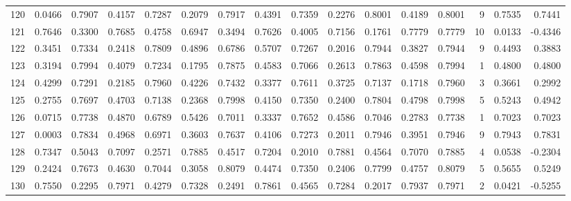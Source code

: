 \begin{tabular}{lrrrrrrrrrrrrrrr}
120 &      0.0466 &  0.7907 &  0.4157 &  0.7287 &  0.2079 &  0.7917 &  0.4391 &  0.7359 &  0.2276 &  0.8001 &   0.4189 &     0.8001 &      9 &                    0.7535 &                     0.7441 \\
121 &      0.7646 &  0.3300 &  0.7685 &  0.4758 &  0.6947 &  0.3494 &  0.7626 &  0.4005 &  0.7156 &  0.1761 &   0.7779 &     0.7779 &     10 &                    0.0133 &                    -0.4346 \\
122 &      0.3451 &  0.7334 &  0.2418 &  0.7809 &  0.4896 &  0.6786 &  0.5707 &  0.7267 &  0.2016 &  0.7944 &   0.3827 &     0.7944 &      9 &                    0.4493 &                     0.3883 \\
123 &      0.3194 &  0.7994 &  0.4079 &  0.7234 &  0.1795 &  0.7875 &  0.4583 &  0.7066 &  0.2613 &  0.7863 &   0.4598 &     0.7994 &      1 &                    0.4800 &                     0.4800 \\
124 &      0.4299 &  0.7291 &  0.2185 &  0.7960 &  0.4226 &  0.7432 &  0.3377 &  0.7611 &  0.3725 &  0.7137 &   0.1718 &     0.7960 &      3 &                    0.3661 &                     0.2992 \\
125 &      0.2755 &  0.7697 &  0.4703 &  0.7138 &  0.2368 &  0.7998 &  0.4150 &  0.7350 &  0.2400 &  0.7804 &   0.4798 &     0.7998 &      5 &                    0.5243 &                     0.4942 \\
126 &      0.0715 &  0.7738 &  0.4870 &  0.6789 &  0.5426 &  0.7011 &  0.3337 &  0.7652 &  0.4586 &  0.7046 &   0.2783 &     0.7738 &      1 &                    0.7023 &                     0.7023 \\
127 &      0.0003 &  0.7834 &  0.4968 &  0.6971 &  0.3603 &  0.7637 &  0.4106 &  0.7273 &  0.2011 &  0.7946 &   0.3951 &     0.7946 &      9 &                    0.7943 &                     0.7831 \\
128 &      0.7347 &  0.5043 &  0.7097 &  0.2571 &  0.7885 &  0.4517 &  0.7204 &  0.2010 &  0.7881 &  0.4564 &   0.7070 &     0.7885 &      4 &                    0.0538 &                    -0.2304 \\
129 &      0.2424 &  0.7673 &  0.4630 &  0.7044 &  0.3058 &  0.8079 &  0.4474 &  0.7350 &  0.2406 &  0.7799 &   0.4757 &     0.8079 &      5 &                    0.5655 &                     0.5249 \\
130 &      0.7550 &  0.2295 &  0.7971 &  0.4279 &  0.7328 &  0.2491 &  0.7861 &  0.4565 &  0.7284 &  0.2017 &   0.7937 &     0.7971 &      2 &                    0.0421 &                    -0.5255 \\

\end{tabular}
